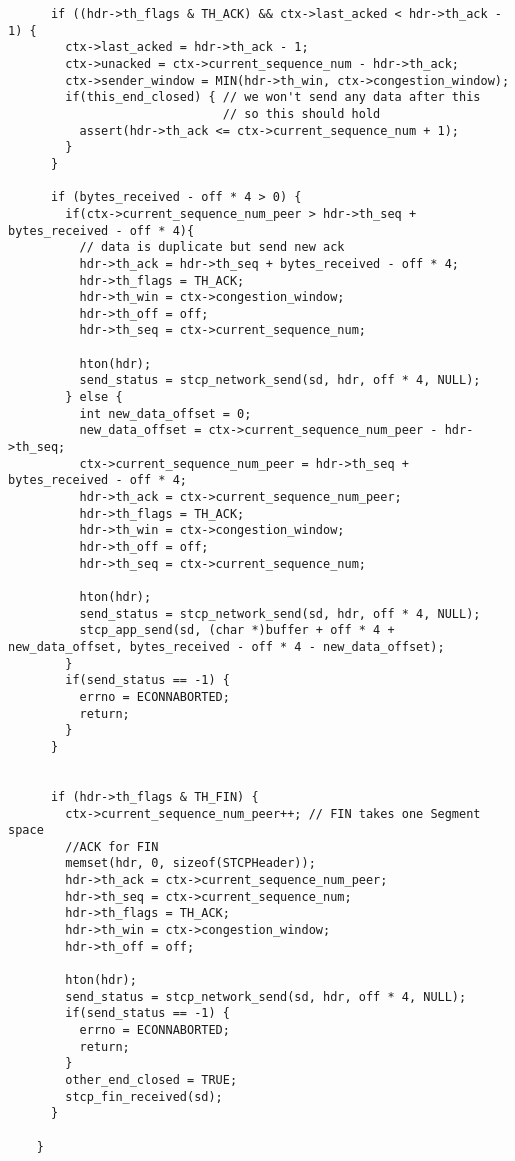 \documentclass[11pt]{article}
\begin{document}
\begin{verbatim}
      if ((hdr->th_flags & TH_ACK) && ctx->last_acked < hdr->th_ack - 1) {
        ctx->last_acked = hdr->th_ack - 1;
        ctx->unacked = ctx->current_sequence_num - hdr->th_ack;
        ctx->sender_window = MIN(hdr->th_win, ctx->congestion_window);
        if(this_end_closed) { // we won't send any data after this
                              // so this should hold
          assert(hdr->th_ack <= ctx->current_sequence_num + 1);
        }
      }

      if (bytes_received - off * 4 > 0) {
        if(ctx->current_sequence_num_peer > hdr->th_seq + bytes_received - off * 4){
          // data is duplicate but send new ack
          hdr->th_ack = hdr->th_seq + bytes_received - off * 4;
          hdr->th_flags = TH_ACK;
          hdr->th_win = ctx->congestion_window;
          hdr->th_off = off;
          hdr->th_seq = ctx->current_sequence_num;

          hton(hdr);
          send_status = stcp_network_send(sd, hdr, off * 4, NULL);
        } else {
          int new_data_offset = 0;
          new_data_offset = ctx->current_sequence_num_peer - hdr->th_seq;
          ctx->current_sequence_num_peer = hdr->th_seq + bytes_received - off * 4;
          hdr->th_ack = ctx->current_sequence_num_peer;
          hdr->th_flags = TH_ACK;
          hdr->th_win = ctx->congestion_window;
          hdr->th_off = off;
          hdr->th_seq = ctx->current_sequence_num;

          hton(hdr);
          send_status = stcp_network_send(sd, hdr, off * 4, NULL);
          stcp_app_send(sd, (char *)buffer + off * 4 + new_data_offset, bytes_received - off * 4 - new_data_offset);
        }
        if(send_status == -1) {
          errno = ECONNABORTED;
          return;
        }
      }


      if (hdr->th_flags & TH_FIN) {
        ctx->current_sequence_num_peer++; // FIN takes one Segment space
        //ACK for FIN
        memset(hdr, 0, sizeof(STCPHeader));
        hdr->th_ack = ctx->current_sequence_num_peer;
        hdr->th_seq = ctx->current_sequence_num;
        hdr->th_flags = TH_ACK;
        hdr->th_win = ctx->congestion_window;
        hdr->th_off = off;

        hton(hdr);
        send_status = stcp_network_send(sd, hdr, off * 4, NULL);
        if(send_status == -1) {
          errno = ECONNABORTED;
          return;
        }
        other_end_closed = TRUE;
        stcp_fin_received(sd);
      }

    }



\end{verbatim}
\end{document}
